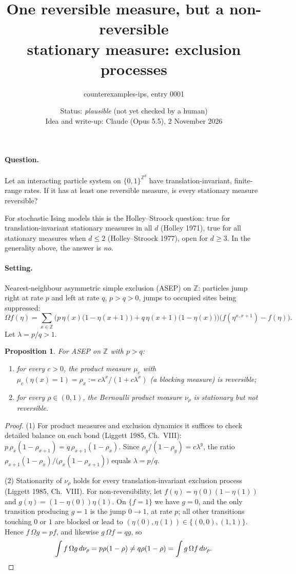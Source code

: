 \documentclass[11pt]{article}
\title{One reversible measure, but a non-reversible\\ stationary measure: exclusion processes}
\author{counterexamples-ips, entry 0001}
\date{Status: \emph{plausible} (not yet checked by a human)\\[2pt] \small Idea and write-up: Claude (Opus 5.5), 2 November 2026}
\newtheorem{proposition}{Proposition}
\theoremstyle{remark}\newtheorem*{remark}{Remark}
\newcommand{\Z}{\mathbb{Z}}
\begin{document}
\maketitle

\paragraph{Question.} Let an interacting particle system on $\{0,1\}^{\Z^d}$ have translation-invariant, finite-range rates. If it has at least one reversible measure, is every stationary measure reversible?

For stochastic Ising models this is the Holley--Stroock question: true for translation-invariant stationary measures in all $d$ (Holley 1971), true for all stationary measures when $d\le 2$ (Holley--Stroock 1977), open for $d\ge3$. In the generality above, the answer is \emph{no}.

\paragraph{Setting.} Nearest-neighbour asymmetric simple exclusion (ASEP) on $\Z$: particles jump right at rate $p$ and left at rate $q$, $p>q>0$, jumps to occupied sites being suppressed:
\[
\Omega f(\eta)=\sum_{x\in\Z}\Big(p\,\eta(x)\big(1-\eta(x+1)\big)+q\,\eta(x+1)\big(1-\eta(x)\big)\Big)\big(f(\eta^{x,x+1})-f(\eta)\big).
\]
Let $\lambda=p/q>1$.

\begin{proposition}
For ASEP on $\Z$ with $p>q$:
\begin{enumerate}
\item for every $c>0$, the product measure $\mu_c$ with $\mu_c(\eta(x)=1)=\rho_x:=c\lambda^x/(1+c\lambda^x)$ (a \emph{blocking measure}) is reversible;
\item for every $\rho\in(0,1)$, the Bernoulli product measure $\nu_\rho$ is stationary but not reversible.
\end{enumerate}
\end{proposition}

\begin{proof}
(1) For product measures and exclusion dynamics it suffices to check detailed balance on each bond (Liggett 1985, Ch.~VIII): $p\,\rho_x(1-\rho_{x+1})=q\,\rho_{x+1}(1-\rho_x)$. Since $\rho_y/(1-\rho_y)=c\lambda^y$, the ratio $\rho_{x+1}(1-\rho_x)/\bigl(\rho_x(1-\rho_{x+1})\bigr)$ equals $\lambda=p/q$.

(2) Stationarity of $\nu_\rho$ holds for every translation-invariant exclusion process (Liggett 1985, Ch.~VIII). For non-reversibility, let $f(\eta)=\eta(0)(1-\eta(1))$ and $g(\eta)=(1-\eta(0))\eta(1)$. On $\{f=1\}$ we have $g=0$, and the only transition producing $g=1$ is the jump $0\to1$, at rate $p$; all other transitions touching $0$ or $1$ are blocked or lead to $(\eta(0),\eta(1))\in\{(0,0),(1,1)\}$. Hence $f\,\Omega g=pf$, and likewise $g\,\Omega f=qg$, so
\[
\int f\,\Omega g\,d\nu_\rho=p\rho(1-\rho)\neq q\rho(1-\rho)=\int g\,\Omega f\,d\nu_\rho .\qedhere
\]
\end{proof}
\end{document}
